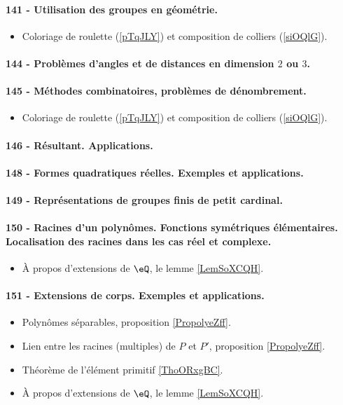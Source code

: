 \paragraph{141 - Utilisation des groupes en géométrie.}
\begin{itemize}
    \item Coloriage de roulette (\ref{pTqJLY}) et composition de colliers (\ref{siOQlG}).
\end{itemize}

\paragraph{144 - Problèmes d’angles et de distances en dimension $2$ ou $3$.}
\paragraph{145 - Méthodes combinatoires, problèmes de dénombrement.}
\begin{itemize}
    \item Coloriage de roulette (\ref{pTqJLY}) et composition de colliers (\ref{siOQlG}).
\end{itemize}

\paragraph{146 - Résultant. Applications.}
\paragraph{148 - Formes quadratiques réelles. Exemples et applications.}
\paragraph{149 - Représentations de groupes finis de petit cardinal.}
\paragraph{150 - Racines d’un polynômes. Fonctions symétriques élémentaires. Localisation des racines dans les cas réel et complexe.}
\begin{itemize}
    \item À propos d'extensions de \( \eQ\), le lemme \ref{LemSoXCQH}.
\end{itemize}
\paragraph{151 - Extensions de corps. Exemples et applications.}
\begin{itemize}
    \item Polynômes séparables, proposition \ref{PropolyeZff}.
    \item Lien entre les racines (multiples) de \( P\) et \( P'\), proposition \ref{PropolyeZff}.
    \item Théorème de l'élément primitif \ref{ThoORxgBC}.
    \item À propos d'extensions de \( \eQ\), le lemme \ref{LemSoXCQH}.
\end{itemize}

